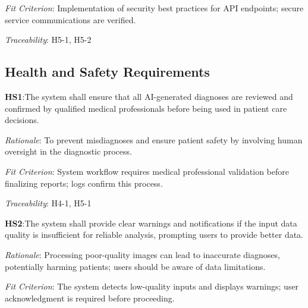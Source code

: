 \documentclass{article}
\begin{document}
\vspace{0.2cm}

\emph{Fit Criterion}: Implementation of security best practices for API endpoints; secure service communications are verified.

\vspace{0.2cm}

\emph{Traceability}: H5-1, H5-2

\vspace{0.5cm}

\subsection{Health and Safety Requirements}

\hspace{0.5cm}\textbf{HS1}:\hypertarget{HS1}{The system shall ensure that all AI-generated diagnoses are reviewed and confirmed by qualified medical professionals before being used in patient care decisions.}
\vspace{0.2cm}

\emph{Rationale}: To prevent misdiagnoses and ensure patient safety by involving human oversight in the diagnostic process.

\vspace{0.2cm}

\emph{Fit Criterion}: System workflow requires medical professional validation before finalizing reports; logs confirm this process.

\vspace{0.2cm}

\emph{Traceability}: H4-1, H5-1

\vspace{0.5cm}

\textbf{HS2}:\hypertarget{HS2}{The system shall provide clear warnings and notifications if the input data quality is insufficient for reliable analysis, prompting users to provide better data.}
\vspace{0.2cm}

\emph{Rationale}: Processing poor-quality images can lead to inaccurate diagnoses, potentially harming patients; users should be aware of data limitations.

\vspace{0.2cm}

\emph{Fit Criterion}: The system detects low-quality inputs and displays warnings; user acknowledgment is required before proceeding.

\vspace{0.2cm}
\end{document}
